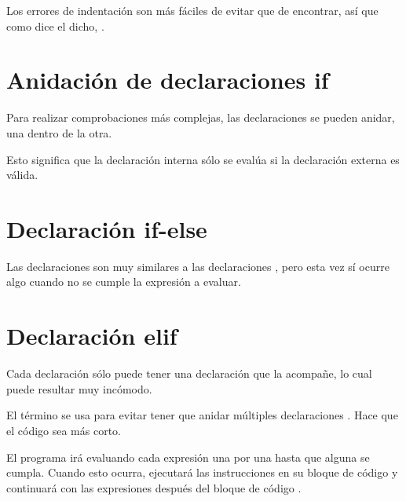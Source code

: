 Los errores de indentación son más fáciles de evitar que de encontrar, así que como dice el dicho, .

\section{Anidación de declaraciones if}

Para realizar comprobaciones más complejas, las declaraciones  se pueden anidar, una dentro de la otra.

Esto significa que la declaración  interna sólo se evalúa si la declaración  externa es válida.


\section{Declaración if-else}

Las declaraciones  son muy similares a las declaraciones , pero esta vez sí ocurre algo cuando no se cumple la expresión a evaluar.


\section{Declaración elif}

Cada declaración  sólo puede tener una declaración  que la acompañe, lo cual puede resultar muy incómodo.


El término  se usa para evitar tener que anidar múltiples declaraciones .
Hace que el código sea más corto.


El programa irá evaluando cada expresión una por una hasta que alguna se cumpla.
Cuando esto ocurra, ejecutará las instrucciones en su bloque de código y continuará con las expresiones después del bloque de código .

